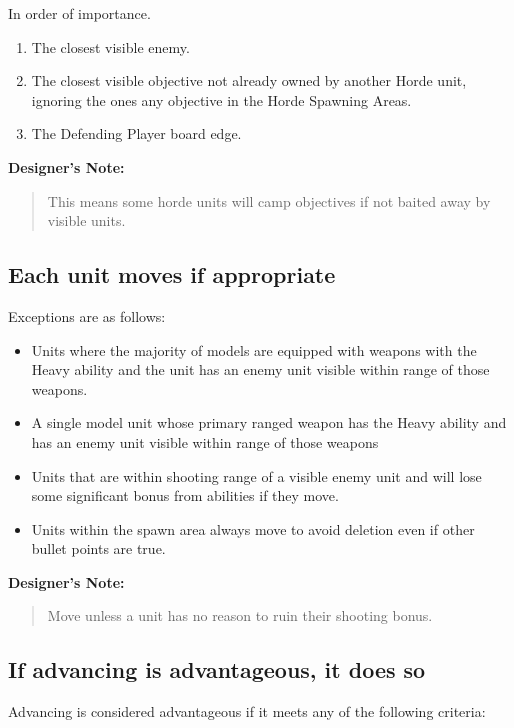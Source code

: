 \documentclass{HordeModeTarot}
\begin{document}
In order of importance.

\begin{enumerate}
\item{} The closest visible enemy.
\item{} The closest visible objective not already owned by another Horde unit, ignoring the ones any objective in the Horde Spawning Areas.
\item{} The Defending Player board edge.
\end{enumerate}

\textbf{Designer's Note:}

\begin{quote}
This means some horde units will camp objectives if not baited away by visible units.
\end{quote}

\subsection*{Each unit moves if appropriate}

Exceptions are as follows:

\begin{itemize}
\item{} Units where the majority of models are equipped with weapons with the Heavy ability and the unit has an enemy unit visible within range of those weapons.
\item{} A single model unit whose primary ranged weapon has the Heavy ability and has an enemy unit visible within range of those weapons
\item{} Units that are within shooting range of a visible enemy unit and will lose some significant bonus from abilities if they move.
\item{} Units within the spawn area always move to avoid deletion even if other bullet points are true.
\end{itemize}

\textbf{Designer's Note:}

\begin{quote}
Move unless a unit has no reason to ruin their shooting bonus.
\end{quote}

\subsection*{If advancing is advantageous, it does so}

Advancing is considered advantageous if it meets any of the following criteria:
\end{document}
